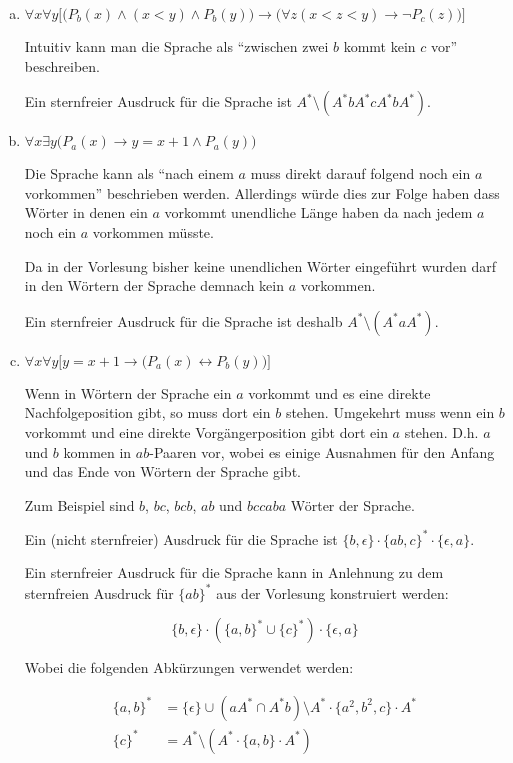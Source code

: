 \documentclass{scrartcl}
\begin{document}
\begin{enumerate}[(a)]
    \item $\forall x \forall y\Big[\big(P_b(x) \land (x < y) \land P_b(y)\big) \rightarrow \big(\forall z (x < z < y) \rightarrow \lnot P_c(z)\big)\Big]$

      Intuitiv kann man die Sprache als \enquote{zwischen zwei $b$ kommt kein $c$ vor} beschreiben.

      Ein sternfreier Ausdruck für die Sprache ist $A^* \setminus (A^* b A^* c A^* b A^*)$.

    \item $\forall x \exists y \Big( P_a(x) \rightarrow y = x+1 \land P_a(y)\Big)$

      Die Sprache kann als \enquote{nach einem $a$ muss direkt darauf folgend noch ein $a$ vorkommen} beschrieben werden. Allerdings würde dies zur Folge haben dass Wörter in denen ein $a$ vorkommt unendliche Länge haben da nach jedem $a$ noch ein $a$ vorkommen müsste.

      Da in der Vorlesung bisher keine unendlichen Wörter eingeführt wurden darf in den Wörtern der Sprache demnach kein $a$ vorkommen.

      Ein sternfreier Ausdruck für die Sprache ist deshalb $A^* \setminus (A^* a A^*)$.
    \item $\forall x \forall y \Big[ y = x+1 \rightarrow \big(P_a(x) \leftrightarrow P_b(y)\big)\Big]$

      Wenn in Wörtern der Sprache ein $a$ vorkommt und es eine direkte Nachfolgeposition gibt, so muss dort ein $b$ stehen. Umgekehrt muss wenn ein $b$ vorkommt und eine direkte Vorgängerposition gibt dort ein $a$ stehen. D.h. $a$ und $b$ kommen in $ab$-Paaren vor, wobei es einige Ausnahmen für den Anfang und das Ende von Wörtern der Sprache gibt.

      Zum Beispiel sind $b$, $bc$, $bcb$, $ab$ und $bccaba$ Wörter der Sprache.

      Ein (nicht sternfreier) Ausdruck für die Sprache ist $\{b, \epsilon\} \cdot \{ab,c\}^* \cdot \{\epsilon, a\}$.

      Ein sternfreier Ausdruck für die Sprache kann in Anlehnung zu dem sternfreien Ausdruck für $\{ab\}^*$ aus der Vorlesung konstruiert werden:

      \begin{equation*}
        \{b, \epsilon\} \cdot (\{a,b\}^* \cup \{c\}^*) \cdot \{\epsilon, a\}
      \end{equation*}

      Wobei die folgenden Abkürzungen verwendet werden:

      \begin{align*}
        \{a,b\}^* &= \{\epsilon\} \cup (aA^* \cap A^*b) \setminus A^* \cdot \{a^2, b^2, c\} \cdot A^*\\
        \{c\}^* &= A^* \setminus (A^* \cdot \{a, b\} \cdot A^*)
      \end{align*}
\end{enumerate}
\end{document}
